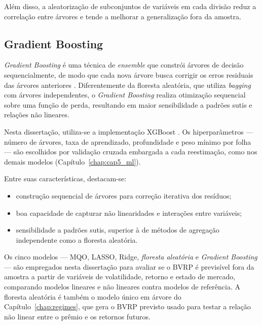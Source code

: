 Além disso, a aleatorização de subconjuntos de variáveis em cada divisão reduz a
correlação entre árvores e tende a melhorar a generalização fora da amostra.

\subsection{Gradient Boosting}

\textit{Gradient Boosting} é uma técnica de \textit{ensemble} que constrói
árvores de decisão sequencialmente, de modo que cada nova árvore busca corrigir
os erros residuais das árvores anteriores \citep{friedman2001gradientboosting}.
Diferentemente da floresta aleatória, que utiliza \textit{bagging} com árvores
independentes, o \textit{Gradient Boosting} realiza otimização sequencial sobre
uma função de perda, resultando em maior sensibilidade a padrões sutis e
relações não lineares.

Nesta dissertação, utiliza-se a implementação XGBoost
\citep{chen2016xgboost}. Os hiperparâmetros --- número de árvores, taxa de
aprendizado, profundidade e peso mínimo por folha --- são escolhidos por
validação cruzada embargada a cada reestimação, como nos demais modelos
(Capítulo~\ref{chap:cap5_ml}).

Entre suas características, destacam-se:

\begin{itemize}
    \item construção sequencial de árvores para correção iterativa dos resíduos;
    \item boa capacidade de capturar não linearidades e interações entre
          variáveis;
    \item sensibilidade a padrões sutis, superior à de métodos de agregação
          independente como a floresta aleatória.
\end{itemize}

Os cinco modelos --- MQO, LASSO, Ridge, \textit{floresta aleatória} e
\textit{Gradient Boosting} --- são empregados nesta dissertação para avaliar se o
BVRP é previsível fora da amostra a partir de variáveis de volatilidade, retorno
e estado de mercado, comparando modelos lineares e não lineares contra
modelos de referência. A floresta aleatória é também o modelo único em árvore
do Capítulo~\ref{chap:regimes}, que gera o BVRP previsto usado para testar a
relação não linear entre o prêmio e os retornos futuros.
